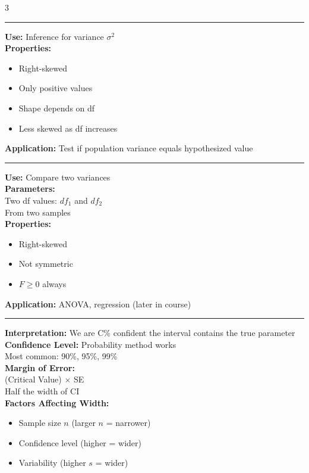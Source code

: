 \documentclass[8pt, letterpaper]{article}
\newcommand{\sectionhead}[1]{%
    \vspace{1.2mm}{\large\bfseries#1}\vspace{0.2mm}\hrule\vspace{0.8mm}%
}
\begin{document}
\begin{multicols}{3}
\sectionhead{Chi-Squared Distribution}

\textbf{Use:} Inference for variance $\sigma^2$ \\[1mm]
\textbf{Properties:}
\begin{itemize}
    \item Right-skewed
    \item Only positive values
    \item Shape depends on df
    \item Less skewed as df increases
\end{itemize}

\textbf{Application:}
Test if population variance equals
hypothesized value

\sectionhead{F-Distribution}

\textbf{Use:} Compare two variances \\[1mm]
\textbf{Parameters:} \\
Two df values: $df_1$ and $df_2$ \\
From two samples \\[1mm]
\textbf{Properties:}
\begin{itemize}
    \item Right-skewed
    \item Not symmetric
    \item $F \ge 0$ always
\end{itemize}

\textbf{Application:}
ANOVA, regression (later in course)

\sectionhead{Confidence Intervals}

\textbf{Interpretation:}
We are C\% confident the interval
contains the true parameter \\
\textbf{Confidence Level:}
Probability method works \\
Most common: 90\%, 95\%, 99\% \\
\textbf{Margin of Error:} \\
(Critical Value) $\times$ SE \\
Half the width of CI \\[1mm]
\textbf{Factors Affecting Width:}
\begin{itemize}
    \item Sample size $n$ (larger $n$ = narrower)
    \item Confidence level (higher = wider)
    \item Variability (higher $s$ = wider)
\end{itemize}

\columnbreak


\end{multicols}
\end{document}
